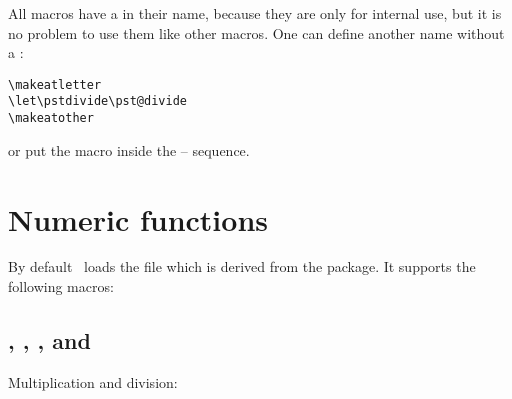 \documentclass[11pt,english,BCOR=10mm,DIV12,bibliography=totoc,parskip=false,headings=small,,
    headinclude=false,footinclude=false,oneside]{pst-doc}
\let\Lfile\LFile
\def\textat{\char064}
\begin{document}
All macros have a \textat{} in their name, because they are
only for internal use, but it is no problem to use them like other
macros. One can define another name without a \textat{}:
\begin{lstlisting}[style=syntax]
\makeatletter
\let\pstdivide\pst@divide
\makeatother
\end{lstlisting}

or put the macro inside the  --  sequence.


\section{Numeric functions}

By default \PST\ loads the file \Lfile{pst-fp} which is derived from the
 package. It supports the following macros:

\subsection{, , , and }
Multiplication and division:

\begin{BDef}
\\
\\
\\
\end{BDef}

\begin{LTXexample}[width=5cm]
\pstFPmul{} \Result\quad
\pstFPdiv{} \Result\\
\pstFPmul{} \Result\quad
\pstFPdiv{} \Result\\
\pstFPmul{} \Result\quad
\pstFPdiv{} \Result\\
\pstFPadd{} \Result\quad
\pstFPadd{} \Result\\
\pstFPsub{} \Result\quad
\pstFPsub{} \Result
\end{LTXexample}
\end{document}
